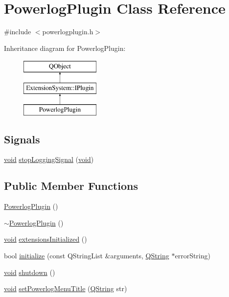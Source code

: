 \hypertarget{class_powerlog_plugin}{\section{Powerlog\-Plugin Class Reference}
\label{class_powerlog_plugin}
}


{\ttfamily \#include $<$powerlogplugin.\-h$>$}

Inheritance diagram for Powerlog\-Plugin\-:\begin{figure}[H]
\begin{center}
\leavevmode
\includegraphics[height=3.000000cm]{class_powerlog_plugin}
\end{center}
\end{figure}
\subsection*{Signals}
\begin{DoxyCompactItemize}
\item 
\hyperlink{group___u_a_v_objects_plugin_ga444cf2ff3f0ecbe028adce838d373f5c}{void} \hyperlink{class_powerlog_plugin_ae0143a88ad6fd432415071ef7b0c4168}{stop\-Logging\-Signal} (\hyperlink{group___u_a_v_objects_plugin_ga444cf2ff3f0ecbe028adce838d373f5c}{void})
\end{DoxyCompactItemize}
\subsection*{Public Member Functions}
\begin{DoxyCompactItemize}
\item 
\hyperlink{group___power_log_ga9e38cb901b8c4d1f73f06f2b6e481e2e}{Powerlog\-Plugin} ()
\item 
\hyperlink{group___power_log_ga2556b7dd74c9d3c635c84f31a40269cd}{$\sim$\-Powerlog\-Plugin} ()
\item 
\hyperlink{group___u_a_v_objects_plugin_ga444cf2ff3f0ecbe028adce838d373f5c}{void} \hyperlink{group___power_log_gabdc836ec2b2a95cfe56fabe4d8c8e629}{extensions\-Initialized} ()
\item 
bool \hyperlink{group___power_log_gadc5a5af4c3942d0ec384cad6f677cef3}{initialize} (const Q\-String\-List \&arguments, \hyperlink{group___u_a_v_objects_plugin_gab9d252f49c333c94a72f97ce3105a32d}{Q\-String} $\ast$error\-String)
\item 
\hyperlink{group___u_a_v_objects_plugin_ga444cf2ff3f0ecbe028adce838d373f5c}{void} \hyperlink{group___power_log_gabcda6ddff409dc11244b3df09276d0cc}{shutdown} ()
\item 
\hyperlink{group___u_a_v_objects_plugin_ga444cf2ff3f0ecbe028adce838d373f5c}{void} \hyperlink{class_powerlog_plugin_ae881ec37fb9fd9720a404907b20adbcd}{set\-Powerlog\-Menu\-Title} (\hyperlink{group___u_a_v_objects_plugin_gab9d252f49c333c94a72f97ce3105a32d}{Q\-String} str)
\end{DoxyCompactItemize}


